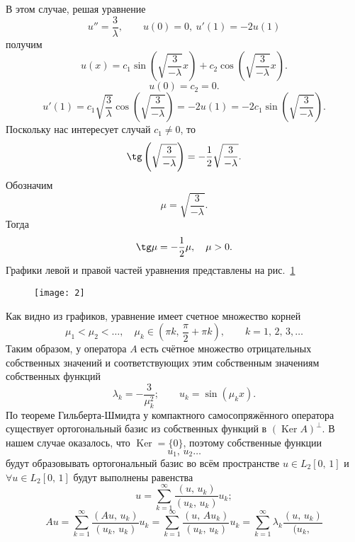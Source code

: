 \documentclass[a4paper]{article}
\begin{document}
\begin{sol}
\begin{enumerate}
\begin{enumerate}
	В этом случае, решая уравнение
	\[
		u''=\frac{3}{\lambda},\qquad u(0)=0,\
		u'(1)=-2u(1)
	\]
	получим
	\[
		u(x)= c_1 \sin \left( \sqrt{\frac{3}{-\lambda}}x \right) +c_2 \cos \left( \sqrt{\frac{3}{-\lambda}}x  \right) 
	.\] 
	\[
		u(0)=c_2=0
	.\] 
	\[
		u'(1)= c_1 \sqrt{\frac{3}{\lambda}} 
		\cos \left( \sqrt{\frac{3}{-\lambda}}  \right) =
		-2 u(1)= -2c_1 \sin \left( \sqrt{\frac{3}{-\lambda}}  \right) 
	.\] 
	Поскольку нас интересует случай $c_1\neq 0$, то
	\[
		\tg\left( \sqrt{\frac{3}{-\lambda}}  \right) =
		-\frac{1}{2}\sqrt{\frac{3}{-\lambda}} 
	.\] 
	Обозначим
	\[
	\mu= \sqrt{\frac{3}{-\lambda}} 
	.\] 
	Тогда
	\[
	\tg \mu= -\frac{1}{2}\mu,\quad \mu>0
	.\] 
	Графики левой и правой частей уравнения представлены
	на рис.~\ref{fig:2}
	\begin{figure}[htpb]
		\centering
		\texttt{[image: 2]}
		\caption{}
		\label{fig:2}
	\end{figure}
%
%
Как видно из графиков, уравнение имеет счетное множество корней
\[\mu_1<\mu_2<\ldots,\quad \mu_k \in \left( \pi k,\,\frac{\pi}{2}+\pi k \right) , \qquad k=1,\,2,\,3,\ldots\]
Таким образом, у оператора $A$ есть счётное множество отрицательных
собственных значений и соответствующих этим собственным
значениям собственных функций
\[
	\lambda_k=- \frac{3}{\mu_k^2};\qquad u_k= \sin\left( \mu_k x \right) 
.\] 
По теореме Гильберта-Шмидта у компактного самосопряжённого
оператора существует ортогональный базис из собственных
функций в $\left( \operatorname{Ker}A \right) ^\perp$. В
нашем случае оказалось, что $\operatorname{Ker}=\{0\} $,
поэтому собственные функции
\[
u_1,\,u_2\ldots
\]
будут образовывать ортогональный базис во всём пространстве
$u \in L_2[0,\,1]$ и $\forall u \in L_2[0,\,1]$ будут
выполнены равенства
\[
	u= \sum_{k=1}^{\infty} \frac{(u,\,u_k)}{(u_k,\,u_k)}
	u_k;
\]
\[
	Au= \sum_{k=1}^{\infty} \frac{(Au,\,u_k)}{(u_k,\,u_k)}u_k
	=\sum_{k=1}^{\infty} \frac{(u,\,Au_k)}{(u_k,\,u_k)}u_k=
	\sum_{k=1}^{\infty} \lambda_k \frac{(u,\,u_k)}{(u_k,\,
}\]
\end{enumerate}
\end{enumerate}
\end{sol}
\end{document}
